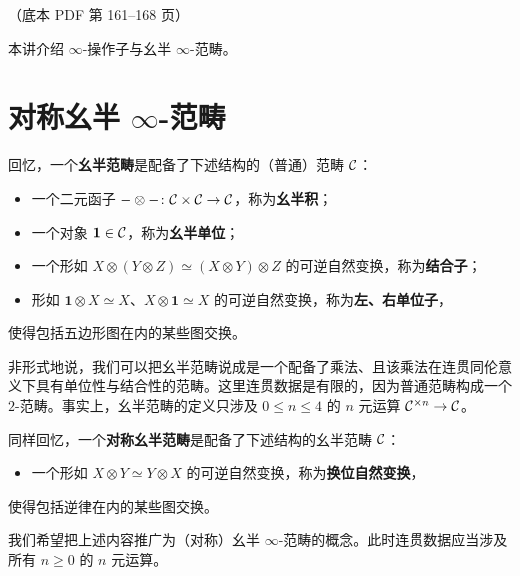 \begin{center}\small\color{black!55}（底本 PDF 第 161–168 页）\end{center}

本讲介绍 $\infty$-操作子与幺半 $\infty$-范畴。

\section{对称幺半 $\infty$-范畴}

\nitem\label{L21-1.1} 回忆，一个\textbf{幺半范畴}是配备了下述结构的（普通）范畴 $\mathcal{C}$：
\begin{itemize}[leftmargin=2.2em,itemsep=0.1em]
\item 一个二元函子 $-\otimes-\colon\mathcal{C}\times\mathcal{C}\to\mathcal{C}$，称为\textbf{幺半积}；
\item 一个对象 $\mathbf{1}\in\mathcal{C}$，称为\textbf{幺半单位}；
\item 一个形如 $X\otimes(Y\otimes Z)\simeq(X\otimes Y)\otimes Z$ 的可逆自然变换，称为\textbf{结合子}；
\item 形如 $\mathbf{1}\otimes X\simeq X$、$X\otimes\mathbf{1}\simeq X$ 的可逆自然变换，称为\textbf{左、右单位子}，
\end{itemize}
使得包括五边形图在内的某些图交换。

非形式地说，我们可以把幺半范畴说成是一个配备了乘法、且该乘法在连贯同伦意义下具有单位性与结合性的范畴。这里连贯数据是有限的，因为普通范畴构成一个 $2$-范畴。事实上，幺半范畴的定义只涉及 $0\le n\le4$ 的 $n$ 元运算 $\mathcal{C}^{\times n}\to\mathcal{C}$。

\nitem\label{L21-1.2} 同样回忆，一个\textbf{对称幺半范畴}是配备了下述结构的幺半范畴 $\mathcal{C}$：
\begin{itemize}[leftmargin=2.2em,itemsep=0.1em]
\item 一个形如 $X\otimes Y\simeq Y\otimes X$ 的可逆自然变换，称为\textbf{换位自然变换}，
\end{itemize}
使得包括逆律在内的某些图交换。

\nitem\label{L21-1.3} 我们希望把上述内容推广为（对称）幺半 $\infty$-范畴的概念。此时连贯数据应当涉及所有 $n\ge0$ 的 $n$ 元运算。

